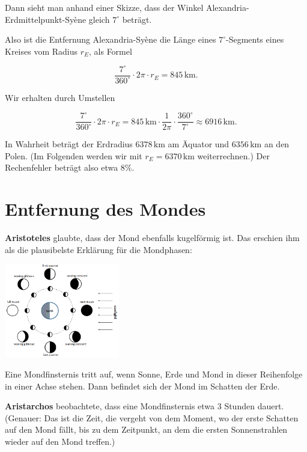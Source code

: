 \documentclass{scrartcl}
\newcommand{\RE}{r_E} %
\newcommand{\person}[1]{\textbf{#1}} %
\newcommand{\km}{\,\mathrm{km}} %
\begin{document}
  Dann sieht man anhand einer Skizze, dass der Winkel Alexandria-Erdmittelpunkt-Syène gleich $7^\circ$ beträgt.

  Also ist die Entfernung Alexandria-Syène die Länge eines $7^\circ$-Segments eines Kreises vom Radius $\RE$, als Formel

  \[ \frac{7^\circ}{360^\circ} \cdot 2 \pi \cdot \RE = 845 \km. \]

  Wir erhalten durch Umstellen

  \[ \frac{7^\circ}{360^\circ} \cdot 2 \pi \cdot \RE = 845 \km \cdot \frac{1}{2 \pi} \cdot \frac{360^\circ}{7^\circ} \approx 6916\km. \]

  In Wahrheit beträgt der Erdradius $6378 \km$ am Äquator und $6356 \km$ an den Polen. (Im Folgenden werden wir mit $\RE = 6370 \km$ weiterrechnen.)
  Der Rechenfehler beträgt also etwa $8 \%$.

  \newpage
  \section{Entfernung des Mondes}

  \person{Aristoteles} glaubte, dass der Mond ebenfalls kugelförmig ist.
  Das erschien ihm als die plausibelste Erklärung für die Mondphasen:

  \begin{center}
    \includegraphics[width=5cm]{lunar_phases.png}
  \end{center}

  Eine Mondfinsternis tritt auf, wenn Sonne, Erde und Mond in dieser Reihenfolge in einer Achse stehen. Dann befindet sich der Mond im Schatten der Erde.

  \person{Aristarchos} beobachtete, dass eine Mondfinsternis etwa 3 Stunden dauert. (Genauer: Das ist die Zeit, die vergeht von dem Moment, wo der erste Schatten auf den Mond fällt, bis zu dem Zeitpunkt, an dem die ersten Sonnenstrahlen wieder auf den Mond treffen.)
\end{document}
